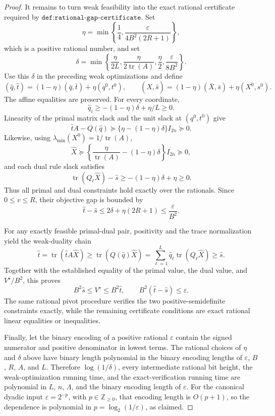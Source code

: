 \documentclass{article}
\begin{document}
\begin{proof}
It remains to turn weak feasibility into the exact rational certificate required by \(\texttt{def:rational-gap-certificate}\).  Set
\[
 \eta=
 \min\!\left\{\frac14,
 \frac{\varepsilon}{4B^2(2R+1)}\right\},
\]
which is a positive rational number, and set
\[
 \delta=
 \min\!\left\{
 \frac{\eta}{2L},
 \frac{\eta}{2\operatorname{tr}(A)},
 \frac{\eta}{2},
 \frac{\varepsilon}{8B^2}
 \right\}.
\]
Use this \(\delta\) in the preceding weak optimizations and define
\[
 (\widehat q,\widehat t)
 =(1-\eta)(\bar q,\bar t)+\eta(q^0,t^0),
 \qquad
 (\widehat X,\widehat s)
 =(1-\eta)(\bar X,\bar s)+\eta(X^0,s^0).
\]
The affine equalities are preserved.  For every coordinate,
\[
 \widehat q_i\ge-(1-\eta)\delta+\eta/L\ge0.
\]
Linearity of the primal matrix slack and the unit slack at \((q^0,t^0)\) give
\[
 \widehat tA-Q(\widehat q)
 \succeq\{\eta-(1-\eta)\delta\}I_{2n}\succeq0.
\]
Likewise, using \(\lambda_{\min}(X^0)=1/\operatorname{tr}(A)\),
\[
 \widehat X
 \succeq\left\{\frac{\eta}{\operatorname{tr}(A)}-(1-\eta)\delta\right\}I_{2n}
 \succeq0,
\]
and each dual rule slack satisfies
\[
 \operatorname{tr}(Q_\ell\widehat X)-\widehat s
 \ge-(1-\eta)\delta+\eta\ge0.
\]
Thus all primal and dual constraints hold exactly over the rationals.  Since \(0\le v\le R\), their objective gap is bounded by
\[
 \widehat t-\widehat s
 \le 2\delta+\eta(2R+1)
 \le\frac{\varepsilon}{B^2}.
\]

For any exactly feasible primal-dual pair, positivity and the trace normalization yield the weak-duality chain
\[
 \widehat t
 =\operatorname{tr}(\widehat tA\widehat X)
 \ge\operatorname{tr}(Q(\widehat q)\widehat X)
 =\sum_{\ell=1}^L\widehat q_\ell\operatorname{tr}(Q_\ell\widehat X)
 \ge\widehat s.
\]
Together with the established equality of the primal value, the dual value, and \(V^\star/B^2\), this proves
\[
 B^2\widehat s\le V^\star\le B^2\widehat t,
 \qquad
 B^2(\widehat t-\widehat s)\le\varepsilon.
\]
The same rational pivot procedure verifies the two positive-semidefinite constraints exactly, while the remaining certificate conditions are exact rational linear equalities or inequalities.

Finally, let the binary encoding of a positive rational \(\varepsilon\) contain the signed numerator and positive denominator in lowest terms.  The rational choices of \(\eta\) and \(\delta\) above have binary length polynomial in the binary encoding lengths of \(\varepsilon\), \(B\), \(R\), \(A\), and \(L\).  Therefore \(\log(1/\delta)\), every intermediate rational bit height, the weak-optimization running time, and the exact-verification running time are polynomial in \(L\), \(n\), \(\Lambda\), and the binary encoding length of \(\varepsilon\).  For the canonical dyadic input \(\varepsilon=2^{-p}\), with \(p\in\mathbb Z_{\ge0}\), that encoding length is \(O(p+1)\), so the dependence is polynomial in \(p=\log_2(1/\varepsilon)\), as claimed.
\end{proof}
\end{document}
